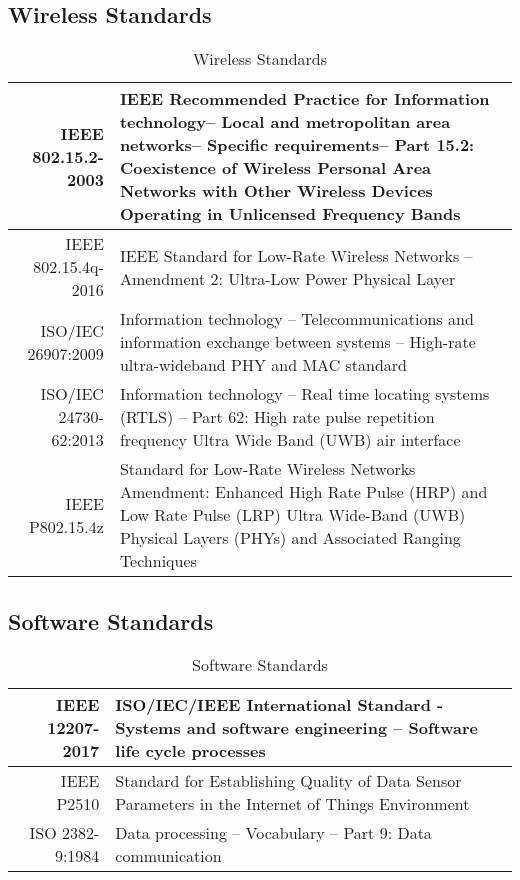 \subsection{Wireless Standards}
\bgroup
\def\arraystretch{1.5}
\begin{table}[H]
\centering
\begin{tabular}{ | p{3.5cm} | p{11.5cm}| } 
\hline
\multicolumn{1}{|r|}{IEEE 802.15.2-2003} & IEEE Recommended Practice for Information technology-- Local and metropolitan area networks-- Specific requirements-- Part 15.2: Coexistence of Wireless Personal Area Networks with Other Wireless Devices Operating in Unlicensed Frequency Bands \cite{R12}\\ 
\hline
\multicolumn{1}{|r|}{IEEE 802.15.4q-2016} & IEEE Standard for Low-Rate Wireless Networks --Amendment 2: Ultra-Low Power Physical Layer \cite{R13}\\ 
\hline
\multicolumn{1}{|r|}{ISO/IEC 26907:2009} & Information technology -- Telecommunications and information exchange between systems -- High-rate ultra-wideband PHY and MAC standard \cite{R14}\\  
\hline
\multicolumn{1}{|r|}{ISO/IEC 24730-62:2013} & Information technology -- Real time locating systems (RTLS) -- Part 62: High rate pulse repetition frequency Ultra Wide Band (UWB) air interface \cite{R15}\\  
\hline
\multicolumn{1}{|r|}{IEEE P802.15.4z} & Standard for Low-Rate Wireless Networks Amendment: Enhanced High Rate Pulse (HRP) and Low Rate Pulse (LRP) Ultra Wide-Band (UWB) Physical Layers (PHYs) and Associated Ranging Techniques \cite{R16}\\  
\hline
\end{tabular}
\caption{Wireless Standards}
\end{table}	


\pagebreak
\subsection{Software Standards}
\bgroup
\def\arraystretch{1.5}
\begin{table}[H]
\centering
\begin{tabular}{ | p{4cm} | p{12cm}| } 
\hline
\multicolumn{1}{|r|}{IEEE 12207-2017} & ISO/IEC/IEEE International Standard - Systems and software engineering -- Software life cycle processes \cite{R17}\\
\hline 
\multicolumn{1}{|r|}{IEEE P2510} & Standard for Establishing Quality of Data Sensor Parameters in the Internet of Things Environment \cite{R18}\\ 
\hline
\multicolumn{1}{|r|}{ISO 2382-9:1984} & Data processing -- Vocabulary -- Part 9: Data communication \cite{R19}\\
\hline 
\end{tabular}
\caption{Software Standards}
\end{table}	
\medskip


